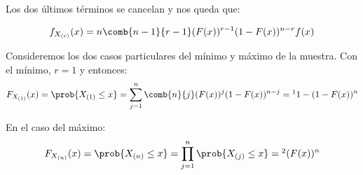 \begin{problem}[7]
Los dos últimos términos se cancelan y nos queda que:

\[ f_{X_{(r)}} (x) = n\comb{n-1}{r-1}(F(x))^{r-1} (1-F(x))^{n-r} f(x) \]

Consideremos los dos casos particulares del mínimo y máximo de la muestra. Con el mínimo, $r=1$ y entonces:
\vspace{-10pt} %
\begin{gather*}
F_{X_{(1)}} (x) =
\prob{X_{(1)} \leq x} =
\sum_{j=1}^n\comb{n}{j}(F(x))^j(1-F(x))^{n-j} =\footnotemark
1 - (1-F(x))^n
\end{gather*}

En el caso del máximo:
\begin{gather*}
F_{X_{(n)}} (x) =
\prob{X_{(n)} \leq x } =
\prod\limits_{j=1}^{n}\prob{X_{(j)} \leq x } =
\footnotemark (F(x))^n
\end{gather*}
\end{problem}


